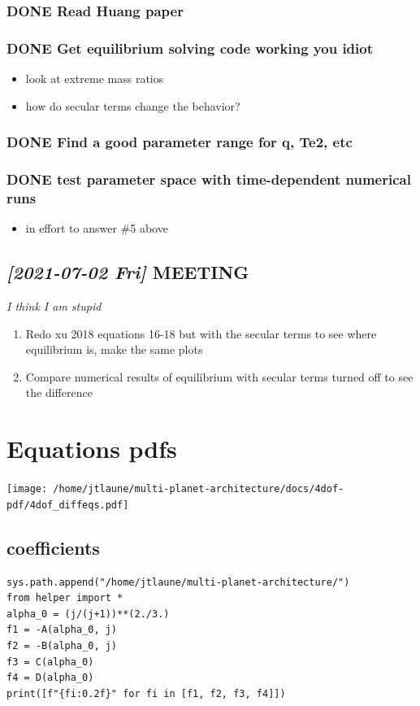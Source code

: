 \documentclass[11pt]{article}
\begin{document}
\subsubsection{{\bfseries\sffamily DONE} Read Huang paper}
\label{sec:org1cc6f77}
\subsubsection{{\bfseries\sffamily DONE} Get equilibrium solving code working you idiot}
\label{sec:orgad27dc0}
\begin{itemize}
\item look at extreme mass ratios
\item how do secular terms change the behavior?
\end{itemize}
\subsubsection{{\bfseries\sffamily DONE} Find a good parameter range for q, Te2, etc}
\label{sec:org57626be}
\subsubsection{{\bfseries\sffamily DONE} test parameter space with time-dependent numerical runs}
\label{sec:org9e258ef}
\begin{itemize}
\item in effort to answer \#5 above
\end{itemize}
\subsection{\textit{[2021-07-02 Fri] } MEETING}
\label{sec:orgc601e0d}
\emph{I think I am stupid}
\begin{enumerate}
\item Redo xu 2018 equations 16-18 but with the secular terms to see
where equilibrium is, make the same plots
\item Compare numerical results of equilibrium with secular terms turned
off to see the difference
\end{enumerate}
\section{Equations pdfs}
\label{sec:orgb1c3661}
\begin{center}
\texttt{[image: /home/jtlaune/multi-planet-architecture/docs/4dof-pdf/4dof\_diffeqs.pdf]}
\end{center}
\subsection{coefficients}
\label{sec:org2adb792}
\begin{verbatim}
sys.path.append("/home/jtlaune/multi-planet-architecture/")
from helper import *
alpha_0 = (j/(j+1))**(2./3.)
f1 = -A(alpha_0, j)
f2 = -B(alpha_0, j)
f3 = C(alpha_0)
f4 = D(alpha_0)
print([f"{fi:0.2f}" for fi in [f1, f2, f3, f4]])
\end{verbatim}
\end{document}
